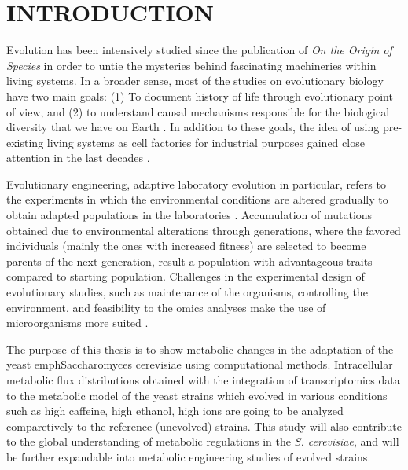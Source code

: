 \chapter{INTRODUCTION}
Evolution has been intensively studied since the publication of \emph{On the Origin of Species} in order to untie the mysteries behind fascinating machineries within living systems. In a broader sense, most of the studies on evolutionary biology have two main goals: (1) To document history of life through evolutionary point of view, and (2) to understand causal mechanisms responsible for the biological diversity that we have on Earth \cite{futuyma2001evolution, hird2017evolutionary}. In addition to these goals, the idea of using pre-existing living systems as cell factories for industrial purposes gained close attention in the last decades \cite{nielsen2016engineering}.

Evolutionary engineering, adaptive laboratory evolution in particular, refers to the experiments in which the environmental conditions are altered gradually to obtain adapted populations in the laboratories \cite{garland2009experimental}. Accumulation of mutations obtained due to environmental alterations through generations, where the favored individuals (mainly the ones with increased fitness) are selected to become parents of the next generation, result a population with advantageous traits compared to starting population. Challenges in the experimental design of evolutionary studies, such as maintenance of the organisms, controlling the environment, and feasibility to the omics analyses make the use of microorganisms more suited \cite{mcdonald2019microbial}.

The purpose of this thesis is to show metabolic changes in the adaptation of the yeast emph{Saccharomyces cerevisiae} using computational methods. Intracellular metabolic flux distributions obtained with the integration of transcriptomics data to the metabolic model of the yeast strains which evolved in various conditions such as high caffeine, high ethanol, high ions are going to be analyzed comparetively to the reference (unevolved) strains. This study will also contribute to the global understanding of metabolic regulations in the \emph{S. cerevisiae}, and will be further expandable into metabolic engineering studies of evolved strains.

